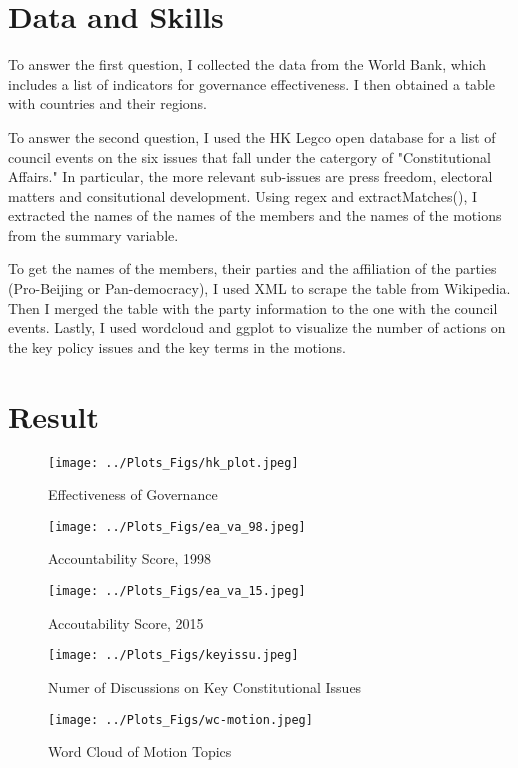 \documentclass[11pt]{article}
\begin{document}
\section*{Data and Skills}
To answer the first question, I collected the data from the World Bank, which includes a list of indicators for governance effectiveness. I then obtained a table with countries and their regions. \par
To answer the second question, I used the HK Legco open database for a list of council events on the six issues that fall under the catergory of "Constitutional Affairs." In particular, the more relevant sub-issues are press freedom, electoral matters and consitutional development. Using regex and extractMatches(), I extracted the names of the names of the members and the names of the motions from the summary variable. \par 
To get the names of the members, their parties and the affiliation of the parties (Pro-Beijing or Pan-democracy), I used XML to scrape the table from Wikipedia. Then I merged the table with the party information to the one with the council events. Lastly, I used wordcloud and ggplot to visualize the number of actions on the key policy issues and the key terms in the motions. 
\section*{Result}
\begin{figure}[H]
	\centering
\texttt{[image: ../Plots\_Figs/hk\_plot.jpeg]} 
\caption{Effectiveness of Governance}
\end{figure}
\begin{figure}
	\centering
\texttt{[image: ../Plots\_Figs/ea\_va\_98.jpeg]} 
\caption{Accountability Score, 1998}
\end{figure}
\begin{figure}
	\centering
\texttt{[image: ../Plots\_Figs/ea\_va\_15.jpeg]} 
\caption{Accoutability Score, 2015}
\end{figure}

\begin{figure}
	\centering
\texttt{[image: ../Plots\_Figs/keyissu.jpeg]} 
\caption{Numer of Discussions on Key Constitutional Issues}
\end{figure}

\begin{figure}
	\centering
\texttt{[image: ../Plots\_Figs/wc-motion.jpeg]} 
\caption{Word Cloud of Motion Topics}
\end{figure}
\end{document}
